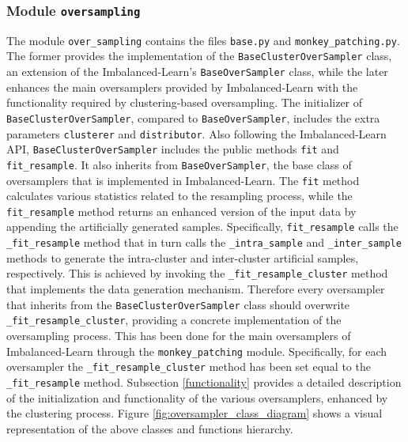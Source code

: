 \documentclass[preprint,12pt, a4paper]{elsarticle}
\begin{document}
\subsubsection{Module \texttt{oversampling}}
\label{oversampling}

The module \texttt{over\_sampling} contains the files \texttt{base.py} and \texttt{monkey\_patching.py}. The former provides the implementation of the \texttt{BaseClusterOverSampler} class, an extension of the Imbalanced-Learn's \texttt{BaseOverSampler} class, while the later enhances the main oversamplers provided by Imbalanced-Learn with the functionality required by clustering-based oversampling. The initializer of \texttt{BaseClusterOverSampler}, compared to \texttt{BaseOverSampler}, includes the extra parameters \texttt{clusterer} and \texttt{distributor}. Also following the Imbalanced-Learn API, \texttt{BaseClusterOverSampler} includes the public methods \texttt{fit} and \texttt{fit\_resample}. It also inherits from \texttt{BaseOverSampler}, the base class of oversamplers that is implemented in Imbalanced-Learn. The \texttt{fit} method calculates various statistics related to the resampling process, while the \texttt{fit\_resample} method returns an enhanced version of the input data by appending the artificially generated samples. Specifically, \texttt{fit\_resample} calls the \texttt{\_fit\_resample} method that in turn calls the \texttt{\_intra\_sample} and \texttt{\_inter\_sample} methods to generate the intra-cluster and inter-cluster artificial samples, respectively. This is achieved by invoking the \texttt{\_fit\_resample\_cluster} method that implements the data generation mechanism. Therefore every oversampler that inherits from the \texttt{BaseClusterOverSampler} class should overwrite \texttt{\_fit\_resample\_cluster}, providing a concrete implementation of the oversampling process. This has been done for the main oversamplers of Imbalanced-Learn through the \texttt{monkey\_patching} module. Specifically, for each oversampler the \texttt{\_fit\_resample\_cluster} method has been set equal to the \texttt{\_fit\_resample} method. Subsection \ref{functionality} provides a detailed description of the initialization and functionality of the various oversamplers, enhanced by the clustering process. Figure \ref{fig:oversampler_class_diagram} shows a visual representation of the above classes and functions hierarchy.
\end{document}
